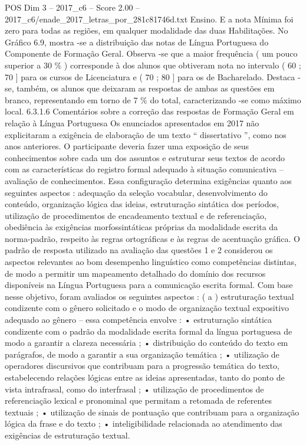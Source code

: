 \begin{textsample}{POS Dim 3 – 2017\_c6 – Score 2.00 – 2017\_c6/enade\_2017\_letras\_por\_281c81746d.txt}
Ensino.
E a nota Mínima foi zero para todas as regiões, em qualquer modalidade das duas Habilitações.
No Gráfico 6.9, mostra -se a distribuição das notas de Língua Portuguesa do Componente de Formação Geral.
Observa -se que a maior frequência ( um pouco superior a 30 \% ) corresponde à dos alunos que obtiveram nota no intervalo ( 60 ; 70 ] para os cursos de Licenciatura e ( 70 ; 80 ] para os de Bacharelado.
Destaca -se, também, os alunos que deixaram as respostas de ambas as questões em branco, representando em torno de 7 \% do total, caracterizando -se como máximo local. 6.3.1.6 Comentários sobre a correção das respostas de Formação Geral em relação à Língua Portuguesa Os enunciados apresentados em 2017 não explicitaram a exigência de elaboração de um texto “ dissertativo ”, como nos anos anteriores.
O participante deveria fazer uma exposição de seus conhecimentos sobre cada um dos assuntos e estruturar seus textos de acordo com as características do registro formal adequado à situação comunicativa – avaliação de conhecimentos.
Essa configuração determina exigências quanto aos seguintes aspectos : adequação da seleção vocabular, desenvolvimento do conteúdo, organização lógica das ideias, estruturação sintática dos períodos, utilização de procedimentos de encadeamento textual e de referenciação, obediência às exigências morfossintáticas próprias da modalidade escrita da norma-padrão, respeito às regras ortográficas e às regras de acentuação gráfica.
O padrão de resposta utilizado na avaliação das questões 1 e 2 considerou os aspectos relevantes ao bom desempenho linguístico como competências distintas, de modo a permitir um mapeamento detalhado do domínio dos recursos disponíveis na Língua Portuguesa para a comunicação escrita formal.
Com base nesse objetivo, foram avaliados os seguintes aspectos : ( a ) estruturação textual condizente com o gênero solicitado e o modo de organização textual expositivo adequado ao gênero – essa competência envolve : • estruturação sintática condizente com o padrão da modalidade escrita formal da língua portuguesa de modo a garantir a clareza necessária ; • distribuição do conteúdo do texto em parágrafos, de modo a garantir a sua organização temática ; • utilização de operadores discursivos que contribuam para a progressão temática do texto, estabelecendo relações lógicas entre as ideias apresentadas, tanto do ponto de vista intrafrasal, como do interfrasal ; • utilização de procedimentos de referenciação lexical e pronominal que permitam a retomada de referentes textuais ; • utilização de sinais de pontuação que contribuam para a organização lógica da frase e do texto ; • inteligibilidade relacionada ao atendimento das exigências de estruturação textual.

\end{textsample}
